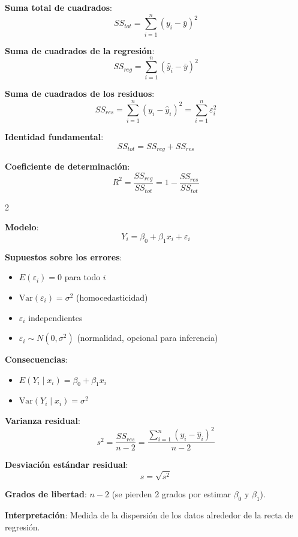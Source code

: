 \documentclass[10pt,a4paper]{article}
\begin{document}
\begin{tcolorbox}[title=Descomposición de la Varianza]
    \textbf{Suma total de cuadrados}:
    \[
        SS_{tot} = \sum_{i=1}^n (y_i - \bar{y})^2
    \]
    
    \textbf{Suma de cuadrados de la regresión}:
    \[
        SS_{reg} = \sum_{i=1}^n (\hat{y}_i - \bar{y})^2
    \]
    
    \textbf{Suma de cuadrados de los residuos}:
    \[
        SS_{res} = \sum_{i=1}^n (y_i - \hat{y}_i)^2 = \sum_{i=1}^n \varepsilon_i^2
    \]
    
    \textbf{Identidad fundamental}:
    \[
        SS_{tot} = SS_{reg} + SS_{res}
    \]
    
    \textbf{Coeficiente de determinación}:
    \[
        R^2 = \frac{SS_{reg}}{SS_{tot}} = 1 - \frac{SS_{res}}{SS_{tot}}
    \]
\end{tcolorbox}


\begin{multicols}{2}
    \begin{tcolorbox}[title=Supuestos del Modelo, equal height group=RL2]
        \textbf{Modelo}:
        \[
            Y_i = \beta_0 + \beta_1 x_i + \varepsilon_i
        \]
        
        \textbf{Supuestos sobre los errores}:
        \begin{itemize}
            \item $E(\varepsilon_i) = 0$ para todo $i$
            \item $\text{Var}(\varepsilon_i) = \sigma^2$ (homocedasticidad)
            \item $\varepsilon_i$ independientes
            \item $\varepsilon_i \sim N(0, \sigma^2)$ (normalidad, opcional para inferencia)
        \end{itemize}
        
        \textbf{Consecuencias}:
        \begin{itemize}
            \item $E(Y_i \mid x_i) = \beta_0 + \beta_1 x_i$
            \item $\text{Var}(Y_i \mid x_i) = \sigma^2$
        \end{itemize}
    \end{tcolorbox}
    \begin{tcolorbox}[title=Estimación de $\sigma^2$, equal height group=RL2]
        \textbf{Varianza residual}:
        \[
            s^2 = \frac{SS_{res}}{n-2} = \frac{\sum_{i=1}^n (y_i - \hat{y}_i)^2}{n-2}
        \]
        
        \textbf{Desviación estándar residual}:
        \[
            s = \sqrt{s^2}
        \]
        
        \textbf{Grados de libertad}: $n-2$ (se pierden 2 grados por estimar $\beta_0$ y $\beta_1$).
        
        \textbf{Interpretación}: Medida de la dispersión de los datos alrededor de la recta de regresión.
    \end{tcolorbox}
\end{multicols}
\end{document}
